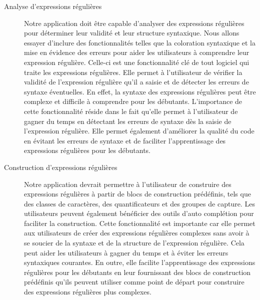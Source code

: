 \documentclass{article}
\begin{document}
    \begin{description}
        \item[Analyse d'expressions régulières] Notre application doit être capable d'analyser des expressions régulières pour déterminer leur validité et leur structure syntaxique. Nous allons essayer d’inclure des fonctionnalités telles que la coloration syntaxique et la mise en évidence des erreurs pour aider les utilisateurs à comprendre leur expression régulière.
Celle-ci est une fonctionnalité clé de tout logiciel qui traite les expressions régulières. Elle permet à l'utilisateur de vérifier la validité de l'expression régulière qu'il a saisie et de détecter les erreurs de syntaxe éventuelles. En effet, la syntaxe des expressions régulières peut être complexe et difficile à comprendre pour les débutants. L'importance de cette fonctionnalité réside dans le fait qu'elle permet à l'utilisateur de gagner du temps en détectant les erreurs de syntaxe dès la saisie de l'expression régulière. Elle permet également d'améliorer la qualité du code en évitant les erreurs de syntaxe et de faciliter l'apprentissage des expressions régulières pour les débutants.

\item[Construction d'expressions régulières] Notre application devrait permettre à l'utilisateur de construire des expressions régulières à partir de blocs de construction prédéfinis,
tels que des classes de caractères, des quantificateurs et des groupes de capture. Les utilisateurs peuvent également bénéficier des outils d'auto complétion pour faciliter la construction. Cette fonctionnalité est importante car elle permet aux utilisateurs de créer des expressions régulières complexes sans avoir à se soucier de la syntaxe et de la structure de l'expression régulière. Cela peut aider les utilisateurs à gagner du temps et à éviter les erreurs syntaxiques courantes. En outre, elle facilite l'apprentissage des expressions régulières pour les débutants en leur fournissant des blocs de construction prédéfinis qu'ils peuvent utiliser comme point de départ pour construire des expressions régulières plus complexes.


\end{description}
\end{document}
